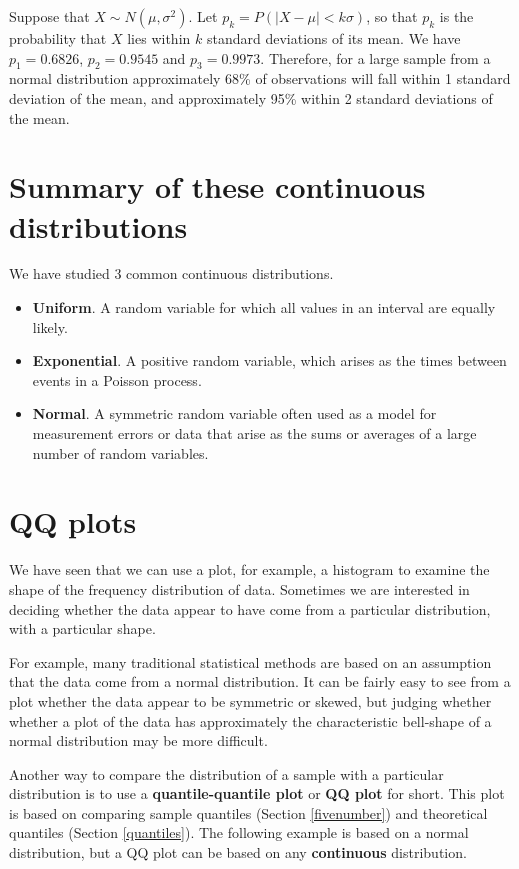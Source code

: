 \documentclass[
  british,
  11pt,
  openany, a4paper]{book}
\providecommand{\tightlist}{%
  \setlength{\itemsep}{0pt}\setlength{\parskip}{0pt}}
\begin{document}
Suppose that \(X \sim N(\mu,\sigma^{2})\). Let \(p_k = P(|X-\mu| < k\sigma)\), so that \(p_k\) is the probability that \(X\) lies within \(k\) standard deviations of its mean. We have \(p_1 = 0.6826\), \(p_2 = 0.9545\) and \(p_3 = 0.9973\). Therefore, for a large sample from a normal distribution
approximately 68\% of observations will fall within 1 standard deviation of the mean, and approximately 95\% within 2 standard deviations of the mean.

\section{Summary of these continuous distributions}\label{summary-of-these-continuous-distributions}

We have studied 3 common continuous distributions.

\begin{itemize}
\tightlist
\item
  \textbf{Uniform}. A random variable for which all values in an interval are equally likely.
\item
  \textbf{Exponential}. A positive random variable, which arises as the times between events in a Poisson process.
\item
  \textbf{Normal}. A symmetric random variable often used as a model for measurement errors or data that arise as the sums or averages of a large number of random variables.
\end{itemize}

\section{QQ plots}\label{qq}

We have seen that we can use a plot, for example, a histogram to examine the shape of the frequency distribution of data. Sometimes we are interested in deciding whether the data appear to have come from a particular distribution, with a particular shape.

For example, many traditional statistical methods are based on an assumption that the data come from a normal distribution. It can be fairly easy to see from a plot whether the data appear to be symmetric or skewed, but judging whether whether a plot of the data has approximately the characteristic bell-shape of a normal distribution may be more difficult.

Another way to compare the distribution of a sample with a particular distribution is to use a \textbf{quantile-quantile plot} or \textbf{QQ plot} for short. This plot is based on comparing sample quantiles (Section \ref{fivenumber}) and theoretical quantiles (Section \ref{quantiles}). The following example is based on a normal distribution, but a QQ plot can be based on any \textbf{continuous} distribution.
\end{document}
